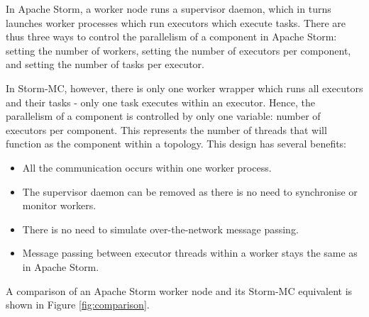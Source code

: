 \documentclass[bsc,logo,frontabs,twoside,singlespacing,normalheadings,parskip]{infthesis}\usepackage[]{graphicx}\usepackage[]{color}
\begin{document}
In Apache Storm, a worker node runs a supervisor daemon, which in turns launches worker processes which run executors which execute tasks. There are thus three ways to control the parallelism of a component in Apache Storm: setting the number of workers, setting the number of executors per component, and setting the number of tasks per executor.

In Storm-MC, however, there is only one worker wrapper which runs all executors and their tasks - only one task executes within an executor. Hence, the parallelism of a component is controlled by only one variable: number of executors per component. This represents the number of threads that will function as the component within a topology. This design has several benefits:

\begin{itemize}
	\item All the communication occurs within one worker process.
	\item The supervisor daemon can be removed as there is no need to synchronise or monitor workers.
	\item There is no need to simulate over-the-network message passing.
	\item Message passing between executor threads within a worker stays the same as in Apache Storm.
\end{itemize}

A comparison of an Apache Storm worker node and its Storm-MC equivalent is shown in Figure \ref{fig:comparison}.
\end{document}
